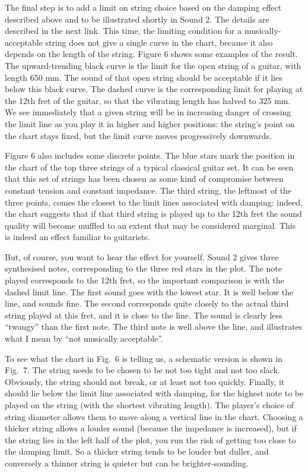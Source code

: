   The final step is to add a limit on string choice based on the damping effect 
  described above and to be illustrated shortly in Sound 2. The details are 
  described in the next link. This time, the limiting condition for a 
  musically-acceptable string does not give a single curve in the chart, 
  because it also depends on the length of the string. Figure 6 shows some 
  examples of the result. The upward-trending black curve is the limit for the 
  open string of a guitar, with length 650 mm. The sound of that open string 
  should be acceptable if it lies below this black curve. The dashed curve is 
  the corresponding limit for playing at the 12th fret of the guitar, so that 
  the vibrating length has halved to 325 mm. We see immediately that a given 
  string will be in increasing danger of crossing the limit line as you play it 
  in higher and higher positions: the string's point on the chart stays fixed, 
  but the limit curve moves progressively downwards. 

  Figure 6 also includes some discrete points. The blue stars mark the position 
  in the chart of the top three strings of a typical classical guitar set. It 
  can be seen that this set of strings has been chosen as some kind of 
  compromise between constant tension and constant impedance. The third string, 
  the leftmost of the three points, comes the closest to the limit lines 
  associated with damping: indeed, the chart suggests that if that third string 
  is played up to the 12th fret the sound quality will become muffled to an 
  extent that may be considered marginal. This is indeed an effect familiar to 
  guitarists. 

  But, of course, you want to hear the effect for yourself. Sound 2 gives three 
  synthesised notes, corresponding to the three red stars in the plot. The note 
  played corresponds to the 12th fret, so the important comparison is with the 
  dashed limit line. The first sound goes with the lowest star. It is well 
  below the line, and sounds fine. The second corresponds quite closely to the 
  actual third string played at this fret, and it is close to the line. The 
  sound is clearly less ``twangy'' than the first note. The third note is well 
  above the line, and illustrates what I mean by ``not musically acceptable''. 

  To see what the chart in Fig.\ 6 is telling us, a schematic version is shown 
  in Fig.\ 7. The string needs to be chosen to be not too tight and not too 
  slack. Obviously, the string should not break, or at least not too quickly. 
  Finally, it should lie below the limit line associated with damping, for the 
  highest note to be played on the string (with the shortest vibrating length). 
  The player's choice of string diameter allows them to move along a vertical 
  line in the chart. Choosing a thicker string allows a louder sound (because 
  the impedance is increased), but if the string lies in the left half of the 
  plot, you run the risk of getting too close to the damping limit. So a 
  thicker string tends to be louder but duller, and conversely a thinner string 
  is quieter but can be brighter-sounding. 

